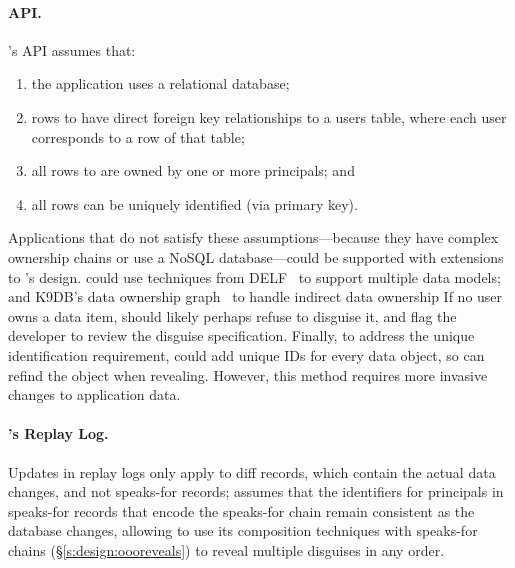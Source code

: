 \paragraph{API.}
\sys's API assumes that:
\begin{enumerate}[nosep]
    \item the application uses a relational database;
    \item rows to \xx have direct foreign key relationships to a users table,
    where each user corresponds to a row of that table;
    \item all rows to \xx are owned by one or more principals; and
    \item all rows can be uniquely identified (\eg via primary key).
\end{enumerate}
%
Applications that do not satisfy these assumptions---\eg because they have
complex ownership chains or use a NoSQL database---could be supported with
extensions to \sys's design. \sys could use techniques from DELF~\cite{delf} to
support multiple data models; 
%
and K9DB's data ownership graph~\cite{k9db} to handle indirect data ownership
If no user owns a data item, \sys should likely perhaps refuse to disguise it, and flag
the developer to review the disguise specification.  
%
Finally, to address the unique identification requirement, \sys could add unique
IDs for every data object, so \sys can refind the object when revealing.
However, this method requires more invasive changes to application data. 
%

\paragraph{\sys's Replay Log.}
\label{s:design:updates:limitations}
%
%

%
Updates in replay logs only apply to diff records, which contain the actual
data changes, and not speaks-for records; \sys assumes that the identifiers for
principals in speaks-for records that encode the speaks-for chain remain
consistent as the database changes, allowing \sys to use its composition
techniques with speaks-for chains (\S\ref{s:design:oooreveals}) to reveal
multiple disguises in any order.
%

